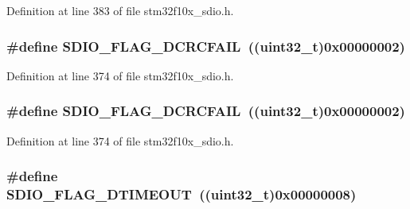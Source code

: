 Definition at line 383 of file stm32f10x\+\_\+sdio.\+h.

\subsubsection[{\texorpdfstring{S\+D\+I\+O\+\_\+\+F\+L\+A\+G\+\_\+\+D\+C\+R\+C\+F\+A\+IL}{SDIO_FLAG_DCRCFAIL}}]{\setlength{\rightskip}{0pt plus 5cm}\#define S\+D\+I\+O\+\_\+\+F\+L\+A\+G\+\_\+\+D\+C\+R\+C\+F\+A\+IL~(({\bf uint32\+\_\+t})0x00000002)}\hypertarget{group___s_d_i_o___flags_ga6de936ea11cbc79444d519268ad9f9bd}{}\label{group___s_d_i_o___flags_ga6de936ea11cbc79444d519268ad9f9bd}


Definition at line 374 of file stm32f10x\+\_\+sdio.\+h.

\subsubsection[{\texorpdfstring{S\+D\+I\+O\+\_\+\+F\+L\+A\+G\+\_\+\+D\+C\+R\+C\+F\+A\+IL}{SDIO_FLAG_DCRCFAIL}}]{\setlength{\rightskip}{0pt plus 5cm}\#define S\+D\+I\+O\+\_\+\+F\+L\+A\+G\+\_\+\+D\+C\+R\+C\+F\+A\+IL~(({\bf uint32\+\_\+t})0x00000002)}\hypertarget{group___s_d_i_o___flags_ga6de936ea11cbc79444d519268ad9f9bd}{}\label{group___s_d_i_o___flags_ga6de936ea11cbc79444d519268ad9f9bd}


Definition at line 374 of file stm32f10x\+\_\+sdio.\+h.

\subsubsection[{\texorpdfstring{S\+D\+I\+O\+\_\+\+F\+L\+A\+G\+\_\+\+D\+T\+I\+M\+E\+O\+UT}{SDIO_FLAG_DTIMEOUT}}]{\setlength{\rightskip}{0pt plus 5cm}\#define S\+D\+I\+O\+\_\+\+F\+L\+A\+G\+\_\+\+D\+T\+I\+M\+E\+O\+UT~(({\bf uint32\+\_\+t})0x00000008)}\hypertarget{group___s_d_i_o___flags_ga2d2fd219dd9fea522862195ab9568345}{}\label{group___s_d_i_o___flags_ga2d2fd219dd9fea522862195ab9568345}


